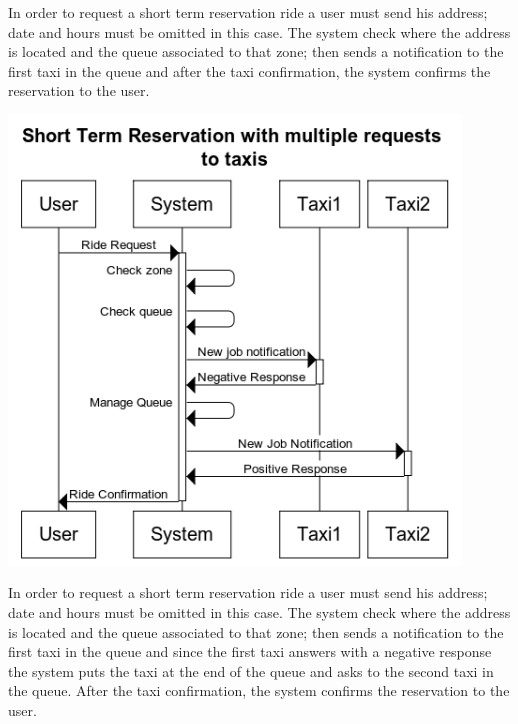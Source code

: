 	In order to request a short term reservation ride a user must send his address; date and hours must be omitted in this case. The system check where the address is located and the queue associated to that zone; then sends a notification to the first taxi in the queue and after the taxi confirmation, the system confirms the reservation to the user.
		\newpage
	\begin{center}
		\includegraphics[width=0.90\textwidth]{./images/Short_Term_Reservation_with_multiple_requests_to_taxis}
	\end{center}
	In order to request a short term reservation ride a user must send his address; date and hours must be omitted in this case. The system check where the address is located and the queue associated to that zone; then sends a notification to the first taxi in the queue and since the first taxi answers with a negative response the system puts the taxi at the end of the queue and asks to the second taxi in the queue. After the taxi confirmation, the system confirms the reservation to the user.
		\newpage
